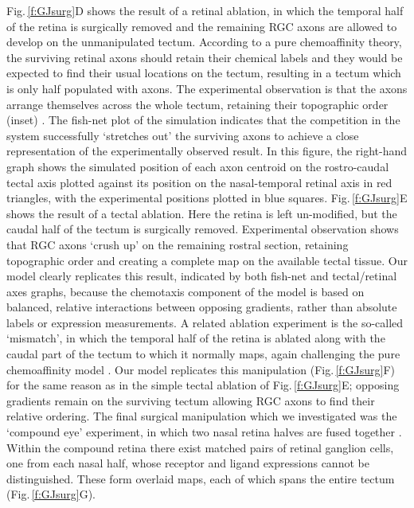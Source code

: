 \documentclass[11pt, a4paper]{article}
\begin{document}
Fig.\,\ref{f:GJsurg}D shows the result of a retinal ablation, in which the temporal half of the retina is surgically removed and the remaining RGC axons are allowed to develop on the unmanipulated tectum.
According to a pure chemoaffinity theory, the surviving retinal axons should retain their chemical labels and they would be expected to find their usual locations on the tectum, resulting in a tectum which is only half populated with axons.
The experimental observation is that the axons arrange themselves across the whole tectum, retaining their topographic order (inset) \citep{attardi_preferential_1963,schmidt_expansion_1978}.
The fish-net plot of the simulation indicates that the competition in the system successfully `stretches out' the surviving axons to achieve a close representation of the experimentally observed result.
In this figure, the right-hand graph shows the simulated position of each axon centroid on the rostro-caudal tectal axis plotted against its position on the nasal-temporal retinal axis in red triangles, with the experimental positions plotted in blue squares.
%
Fig.\,\ref{f:GJsurg}E shows the result of a tectal ablation. Here the retina is left un-modified, but the caudal half of the tectum is surgically removed. Experimental observation \citep{yoon_reorganization_1971,sharma_reformation_1972} shows that RGC axons `crush up' on the remaining rostral section, retaining topographic order and creating a complete map on the available tectal tissue. Our model clearly replicates this result, indicated by both fish-net and tectal/retinal axes graphs, because the chemotaxis component of the model is based on balanced, relative interactions between opposing gradients, rather than absolute labels or expression measurements.
%
A related ablation experiment is the so-called `mismatch', in which the temporal half of the retina is ablated along with the caudal part of the tectum to which it normally maps, again challenging the pure chemoaffinity model \citep{horder_retention_1971}. Our model replicates this manipulation (Fig.\,\ref{f:GJsurg}F) for the same reason as in the simple tectal ablation of Fig.\,\ref{f:GJsurg}E; opposing gradients remain on the surviving tectum allowing RGC axons to find their relative ordering.
%
The final surgical manipulation which we investigated was the `compound eye' experiment, in which two nasal retina halves are fused together \citep{gaze_retino-tectal_1963,fawcett_retinotectal_1982}. Within the compound retina there exist matched pairs of retinal ganglion cells, one from each nasal half, whose receptor and ligand expressions cannot be distinguished. These form overlaid maps, each of which spans the entire tectum (Fig.\,\ref{f:GJsurg}G).
\end{document}
